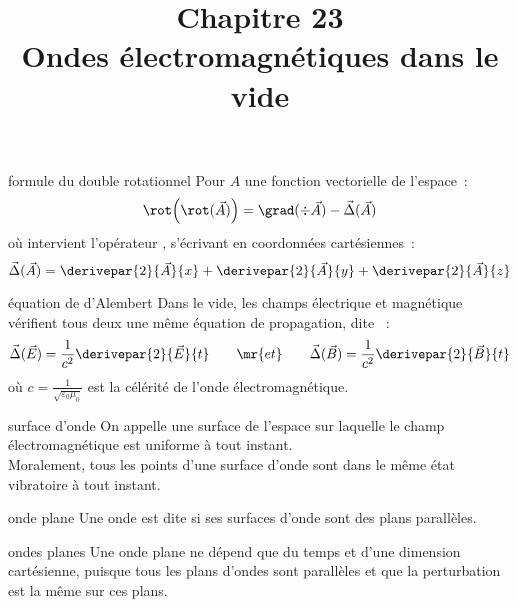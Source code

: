 

\setcounter{chapitre}{23}

\title{\Large Chapitre 23 \\ \Huge Ondes électromagnétiques dans le vide}



\maketitle

\begin{theoreme}{}{formule du double rotationnel}
    Pour $A$ une fonction vectorielle de l'espace~:
    $$\rot \Big( \rot(\vec{A}) \Big) = \grad(\div \vec{A} ) - \vec{\Delta} (\vec{A})$$
    où intervient l'opérateur , s'écrivant en coordonnées cartésiennes~:
    $$\vec{\Delta}(\vec{A}) = \derivepar{2}{\vec{A}}{x} + \derivepar{2}{\vec{A}}{y} + \derivepar{2}{\vec{A}}{z}$$
\end{theoreme}

\begin{theoreme}{}{équation de d'Alembert}
    Dans le vide, les champs électrique et magnétique vérifient tous deux une même équation de propagation, dite ~:
    $$\vec{\Delta}(\vec{E}) = \frac{1}{c^2} \derivepar{2}{\vec{E}}{t} \qquad \mr{et} \qquad \vec{\Delta}(\vec{B}) = \frac{1}{c^2} \derivepar{2}{\vec{B}}{t}$$
    où $\displaystyle c = \frac{1}{\sqrt{\varepsilon_0 \mu_0}}$ est la célérité de l'onde électromagnétique.
\end{theoreme}

\begin{definition}{}{surface d'onde}
    On appelle  une surface de l'espace sur laquelle le champ électromagnétique est uniforme à tout instant.\\
    Moralement, tous les points d'une surface d'onde sont dans le même état vibratoire à tout instant.
\end{definition}

\begin{definition}{}{onde plane}
    Une onde est dite  si ses surfaces d'onde sont des plans parallèles.
\end{definition}

\begin{proposition}{}{ondes planes}
    Une onde plane ne dépend que du temps et d'une dimension cartésienne, puisque tous les plans d'ondes sont parallèles et que la perturbation est la même sur ces plans.
\end{proposition}

